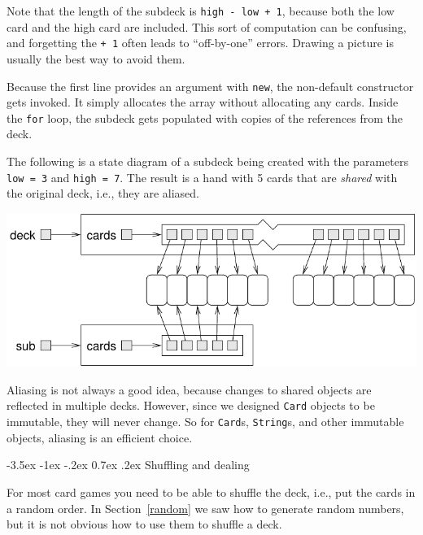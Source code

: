 \documentclass[12pt]{book}
\makeatletter
\theoremstyle{exercise}
\newcommand{\java}[1]{\verb"#1"}
\renewcommand{\section}{\@startsection {section}{1}{\z@}%
    {-3.5ex \@plus -1ex \@minus -.2ex}%
    {0.7ex \@plus.2ex}%
    {\normalfont\Large\bfseries}}
\newcommand{\java}[1]{\lstinline{#1}} %
\makeatother
\begin{document}
Note that the length of the subdeck is \java{high - low + 1}, because both the low card and the high card are included.
This sort of computation can be confusing, and forgetting the \java{+ 1} often leads to ``off-by-one'' errors.
Drawing a picture is usually the best way to avoid them.


Because the first line provides an argument with \java{new}, the non-default constructor gets invoked.
It simply allocates the array without allocating any cards.
Inside the \java{for} loop, the subdeck gets populated with copies of the references from the deck.

The following is a state diagram of a subdeck being created with the parameters \java{low = 3} and \java{high = 7}.
The result is a hand with 5 cards that are {\em shared} with the original deck, i.e., they are aliased.

\begin{center}
\includegraphics{figs/subdeck.pdf}
\end{center}


Aliasing is not always a good idea, because changes to shared objects are reflected in multiple decks.
However, since we designed \java{Card} objects to be immutable, they will never change.
So for \java{Card}s, \java{String}s, and other immutable objects, aliasing is an efficient choice.


\section{Shuffling and dealing}
\label{shuffle}


For most card games you need to be able to shuffle the deck, i.e., put the cards in a random order.
In Section~\ref{random} we saw how to generate random numbers, but it is not obvious how to use them to shuffle a deck.
\end{document}
